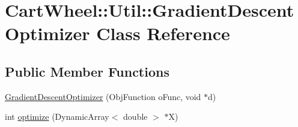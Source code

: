 \hypertarget{classCartWheel_1_1Util_1_1GradientDescentOptimizer}{
\section{CartWheel::Util::GradientDescentOptimizer Class Reference}
\label{classCartWheel_1_1Util_1_1GradientDescentOptimizer}
}
\subsection*{Public Member Functions}
\begin{DoxyCompactItemize}
\item 
\hyperlink{classCartWheel_1_1Util_1_1GradientDescentOptimizer_a3bcbf1e0037c3a54dc6653d4bae547b6}{GradientDescentOptimizer} (ObjFunction oFunc, void $\ast$d)
\item 
int \hyperlink{classCartWheel_1_1Util_1_1GradientDescentOptimizer_aa66e5068f2ba79bbc2e85ec24cac8631}{optimize} (DynamicArray$<$ double $>$ $\ast$X)
\end{DoxyCompactItemize}

